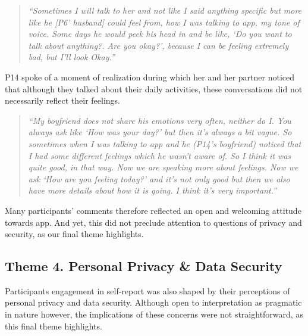                 \begin{quote}
                \vspace{2mm}
                    \textit{``Sometimes I will talk to her and not like I said anything specific but more like he [P6' husband] could feel from, how I was talking to \acl{app}, my tone of voice. Some days he would peek his head in and be like, `Do you want to talk about anything?. Are you okay?', because I can be feeling extremely bad, but I'll look Okay.''}
                \vspace{2mm}
                \end{quote} 

            P14 spoke of a moment of realization during which her and her partner noticed that although they talked about their daily activities, these conversations did not necessarily reflect their feelings. 
            
                \begin{quote}
                \vspace{2mm}
                    \textit{``My boyfriend does not share his emotions very often, neither do I. You always ask like `How was your day?' but then it's always a bit vague. So sometimes when I was talking to \acl{app} and he (P14's boyfriend) noticed that I had some different feelings which he wasn't aware of. So I think it was quite good, in that way. Now we are speaking more about feelings. Now we ask `How are you feeling today?' and it's not only good but then we also have more details about how it is going. I think it's very important.''}
                \vspace{2mm}
                \end{quote} 
                
            Many participants' comments therefore reflected an open and welcoming attitude towards \acl{app}. And yet, this did not preclude attention to questions of privacy and security, as our final theme highlights.

    \subsection{Theme 4. Personal Privacy \& Data Security}
    
        Participants engagement in self-report was also shaped by their perceptions of personal privacy and data security. Although open to interpretation as pragmatic in nature however, the implications of these concerns were not straightforward, as this final theme highlights.   
        
